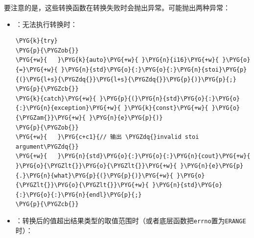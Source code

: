 
要注意的是，这些转换函数在转换失败时会抛出异常。可能抛出两种异常：



\begin{itemize}
\item {}：无法执行转换时：



\begin{codeblockbg}
\begin{Verbatim}[commandchars=\\\{\},breaklines=true,breakanywhere=true,fontsize=\codefont,xleftmargin=17bp]
\PYG{k}{try}
\PYG{p}{\PYGZob{}}
\PYG{+w}{   }\PYG{k}{auto}\PYG{+w}{ }\PYG{n}{i16}\PYG{+w}{ }\PYG{o}{=}\PYG{+w}{ }\PYG{n}{std}\PYG{o}{:}\PYG{o}{:}\PYG{n}{stoi}\PYG{p}{(}\PYG{l+s}{\PYGZdq{}}\PYG{l+s}{\PYGZdq{}}\PYG{p}{)}\PYG{p}{;}
\PYG{p}{\PYGZcb{}}
\PYG{k}{catch}\PYG{+w}{ }\PYG{p}{(}\PYG{n}{std}\PYG{o}{:}\PYG{o}{:}\PYG{n}{exception}\PYG{+w}{ }\PYG{k}{const}\PYG{+w}{ }\PYG{o}{\PYGZam{}}\PYG{+w}{ }\PYG{n}{e}\PYG{p}{)}
\PYG{p}{\PYGZob{}}
\PYG{+w}{   }\PYG{c+c1}{// 输出 \PYGZdq{}invalid stoi argument\PYGZdq{}}
\PYG{+w}{   }\PYG{n}{std}\PYG{o}{:}\PYG{o}{:}\PYG{n}{cout}\PYG{+w}{ }\PYG{o}{\PYGZlt{}}\PYG{o}{\PYGZlt{}}\PYG{+w}{ }\PYG{n}{e}\PYG{p}{.}\PYG{n}{what}\PYG{p}{(}\PYG{p}{)}\PYG{+w}{ }\PYG{o}{\PYGZlt{}}\PYG{o}{\PYGZlt{}}\PYG{+w}{ }\PYG{n}{std}\PYG{o}{:}\PYG{o}{:}\PYG{n}{endl}\PYG{p}{;}
\PYG{p}{\PYGZcb{}}
\end{Verbatim}
\end{codeblockbg}



\item {}：转换后的值超出结果类型的取值范围时（或者底层函数把\texttt{errno}置为\texttt{ERANGE}时）：




\end{itemize}
